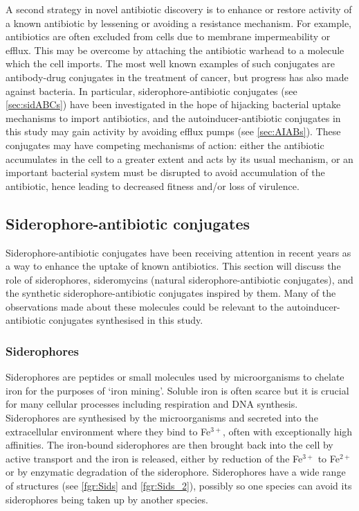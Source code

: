 A second strategy in novel antibiotic discovery is to enhance or restore activity of a known antibiotic by lessening or avoiding a resistance mechanism. For example, antibiotics are often excluded from cells due to membrane impermeability or efflux. This may be overcome by attaching the antibiotic warhead to a molecule which the cell imports. The most well known examples of such conjugates are antibody-drug conjugates\cite{Lambert2018} in the treatment of cancer, but progress has also made against bacteria. In particular, siderophore-antibiotic conjugates (see \ref{sec:sidABCs}) have been investigated in the hope of hijacking bacterial uptake mechanisms to import antibiotics\cite{Page2013}, and the autoinducer-antibiotic conjugates in this study may gain activity by avoiding efflux pumps (see \ref{sec:AIABs}). These conjugates may have competing mechanisms of action: either the antibiotic accumulates in the cell to a greater extent and acts by its usual mechanism, or an important bacterial system must be disrupted to avoid accumulation of the antibiotic, hence leading to decreased fitness and/or loss of virulence.

\subsection{Siderophore-antibiotic conjugates\label{sec:sidABCs}}

Siderophore-antibiotic conjugates have been receiving attention in recent years as a way to enhance the uptake of known antibiotics\cite{Page2013}. This section will discuss the role of siderophores, sideromycins (natural siderophore-antibiotic conjugates), and the synthetic siderophore-antibiotic conjugates inspired by them. Many of the observations made about these molecules could be relevant to the autoinducer-antibiotic conjugates synthesised in this study.

\subsubsection{Siderophores}

Siderophores are peptides or small molecules used by microorganisms to chelate iron for the purposes of `iron mining'\cite{Hider2010}. Soluble iron is often scarce but it is crucial for many cellular processes including respiration and DNA synthesis. Siderophores are synthesised by the microorganisms and secreted into the extracellular environment where they bind to Fe$^{3+}$, often with exceptionally high affinities. The iron-bound siderophores are then brought back into the cell by active transport and the iron is released, either by reduction of the Fe$^{3+}$ to Fe$^{2+}$ or by enzymatic degradation of the siderophore. Siderophores have a wide range of structures (see \ref{fgr:Sids} and \ref{fgr:Sids_2}), possibly so one species can avoid its siderophores being taken up by another species\cite{Seyedsayamdost2012}.

